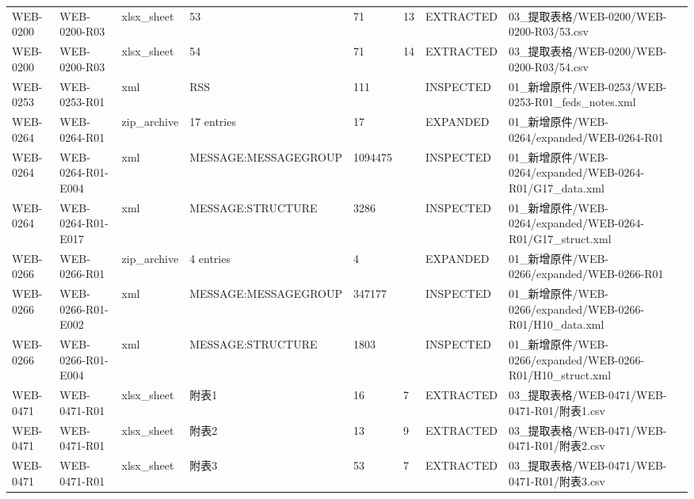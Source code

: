\begin{landscape}
\begin{longtable}{p{1.8cm}p{2.2cm}p{3.1cm}p{4.7cm}p{1.3cm}p{1.3cm}p{3.0cm}p{5.3cm}}
WEB-0200 & WEB-0200-R03 & xlsx\_\allowbreak{}sheet & 53 & 71 & 13 & EXTRACTED & 03\_\allowbreak{}提取表格/\allowbreak{}WEB-0200/\allowbreak{}WEB-0200-R03/\allowbreak{}53.csv\\
WEB-0200 & WEB-0200-R03 & xlsx\_\allowbreak{}sheet & 54 & 71 & 14 & EXTRACTED & 03\_\allowbreak{}提取表格/\allowbreak{}WEB-0200/\allowbreak{}WEB-0200-R03/\allowbreak{}54.csv\\
WEB-0253 & WEB-0253-R01 & xml & RSS & 111 &  & INSPECTED & 01\_\allowbreak{}新增原件/\allowbreak{}WEB-0253/\allowbreak{}WEB-0253-R01\_\allowbreak{}feds\_\allowbreak{}notes.xml\\
WEB-0264 & WEB-0264-R01 & zip\_\allowbreak{}archive & 17 entries & 17 &  & EXPANDED & 01\_\allowbreak{}新增原件/\allowbreak{}WEB-0264/\allowbreak{}expanded/\allowbreak{}WEB-0264-R01\\
WEB-0264 & WEB-0264-R01-E004 & xml & MESSAGE:MESSAGEGROUP & 1094475 &  & INSPECTED & 01\_\allowbreak{}新增原件/\allowbreak{}WEB-0264/\allowbreak{}expanded/\allowbreak{}WEB-0264-R01/\allowbreak{}G17\_\allowbreak{}data.xml\\
WEB-0264 & WEB-0264-R01-E017 & xml & MESSAGE:STRUCTURE & 3286 &  & INSPECTED & 01\_\allowbreak{}新增原件/\allowbreak{}WEB-0264/\allowbreak{}expanded/\allowbreak{}WEB-0264-R01/\allowbreak{}G17\_\allowbreak{}struct.xml\\
WEB-0266 & WEB-0266-R01 & zip\_\allowbreak{}archive & 4 entries & 4 &  & EXPANDED & 01\_\allowbreak{}新增原件/\allowbreak{}WEB-0266/\allowbreak{}expanded/\allowbreak{}WEB-0266-R01\\
WEB-0266 & WEB-0266-R01-E002 & xml & MESSAGE:MESSAGEGROUP & 347177 &  & INSPECTED & 01\_\allowbreak{}新增原件/\allowbreak{}WEB-0266/\allowbreak{}expanded/\allowbreak{}WEB-0266-R01/\allowbreak{}H10\_\allowbreak{}data.xml\\
WEB-0266 & WEB-0266-R01-E004 & xml & MESSAGE:STRUCTURE & 1803 &  & INSPECTED & 01\_\allowbreak{}新增原件/\allowbreak{}WEB-0266/\allowbreak{}expanded/\allowbreak{}WEB-0266-R01/\allowbreak{}H10\_\allowbreak{}struct.xml\\
WEB-0471 & WEB-0471-R01 & xlsx\_\allowbreak{}sheet & 附表1 & 16 & 7 & EXTRACTED & 03\_\allowbreak{}提取表格/\allowbreak{}WEB-0471/\allowbreak{}WEB-0471-R01/\allowbreak{}附表1.csv\\
WEB-0471 & WEB-0471-R01 & xlsx\_\allowbreak{}sheet & 附表2 & 13 & 9 & EXTRACTED & 03\_\allowbreak{}提取表格/\allowbreak{}WEB-0471/\allowbreak{}WEB-0471-R01/\allowbreak{}附表2.csv\\
WEB-0471 & WEB-0471-R01 & xlsx\_\allowbreak{}sheet & 附表3 & 53 & 7 & EXTRACTED & 03\_\allowbreak{}提取表格/\allowbreak{}WEB-0471/\allowbreak{}WEB-0471-R01/\allowbreak{}附表3.csv\\

\end{longtable}
\end{landscape}
